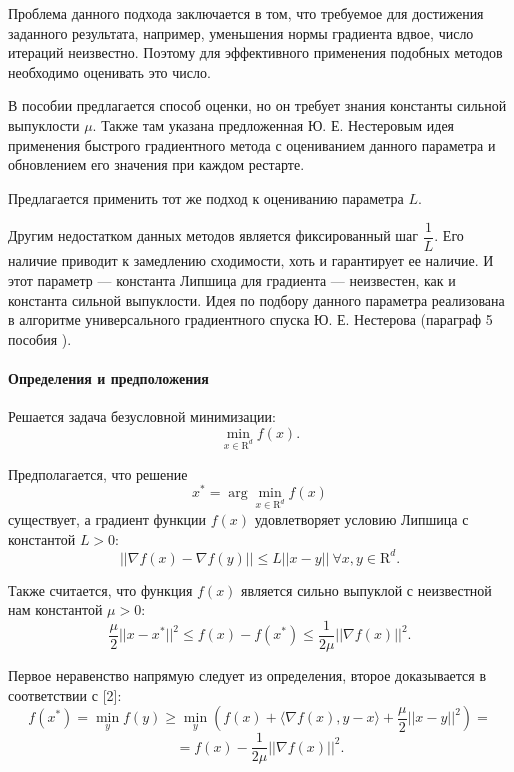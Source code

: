 \documentclass{crm-article}
\begin{document}
Проблема данного подхода заключается в том, что требуемое для достижения заданного результата, например, уменьшения нормы градиента вдвое, число итераций неизвестно. Поэтому для эффективного применения подобных методов необходимо оценивать это число.

В пособии \cite{gasnikov2017universal} предлагается способ оценки, но он требует знания константы сильной выпуклости $\mu$. Также там указана предложенная Ю. Е. Нестеровым идея применения быстрого градиентного метода с оцениванием данного параметра и обновлением его значения при каждом рестарте.

Предлагается применить тот же подход к оцениванию параметра $L$.

Другим недостатком данных методов является фиксированный шаг $\dfrac{1}{L}$. Его наличие приводит к замедлению сходимости, хоть и гарантирует ее наличие. И этот параметр --- константа Липшица для градиента --- неизвестен, как и константа сильной выпуклости. Идея по подбору данного параметра реализована в алгоритме универсального градиентного спуска Ю. Е. Нестерова (параграф 5 пособия \cite{gasnikov2017universal}).

\paragraph{Определения и предположения}

Решается задача безусловной минимизации:
\begin{equation}
\min_{x\in \mathrm{R}^d} f(x).
\end{equation}

Предполагается, что решение
\begin{equation}
x^*=\arg\min_{x\in \mathrm{R}^d} f(x)
\end{equation}
существует, а градиент функции $f(x)$ удовлетворяет условию Липшица с константой $L>0$:
\begin{equation}
||\nabla f(x) - \nabla f(y)||\leq L||x-y||\ \forall x,y\in \mathrm{R}^d.
\end{equation}

Также считается, что функция $f(x)$ является сильно выпуклой с неизвестной нам константой $\mu>0$:
\begin{equation}
\frac{\mu}{2}||x-x^*||^2\leq f(x)-f(x^*)\leq \frac{1}{2\mu}||\nabla f(x)||^2.
\end{equation}

Первое неравенство напрямую следует из определения, второе доказывается в соответствии с [2]:
$$f(x^*) = \min_{y} f(y)\geq \min_y \left(f(x) + \langle \nabla f(x), y-x\rangle + \dfrac{\mu}{2} ||x-y||^2\right) =$$ $$= f(x) - \dfrac{1}{2\mu} ||\nabla f(x)||^2.$$
\end{document}
